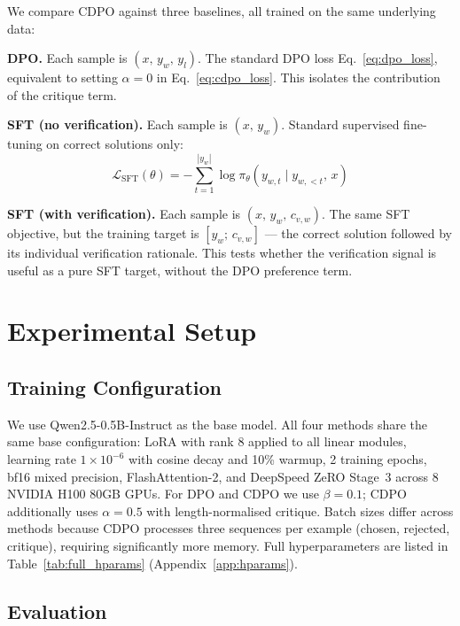 \documentclass[11pt]{article}
\begin{document}
We compare CDPO against three baselines, all trained on the same underlying data:

\textbf{DPO.} Each sample is $(x,\, y_w,\, y_l)$. The standard DPO loss Eq.~\eqref{eq:dpo_loss}, equivalent to setting $\alpha = 0$ in Eq.~\eqref{eq:cdpo_loss}. This isolates the contribution of the critique term.

\textbf{SFT (no verification).} Each sample is $(x,\, y_w)$. Standard supervised fine-tuning on correct solutions only:
\begin{equation}
    \mathcal{L}_{\text{SFT}}(\theta) = -\sum_{t=1}^{|y_w|} \log \pi_\theta(y_{w,t} \mid y_{w,<t},\, x)
    \label{eq:sft_baseline}
\end{equation}

\textbf{SFT (with verification).} Each sample is $(x,\, y_w,\, c_{v,w})$. The same SFT objective, but the training target is $[y_w;\, c_{v,w}]$ --- the correct solution followed by its individual verification rationale. This tests whether the verification signal is useful as a pure SFT target, without the DPO preference term.


\section{Experimental Setup}
\label{sec:experiments}

\subsection{Training Configuration}

We use Qwen2.5-0.5B-Instruct \autocite{qwen2024qwen25} as the base model. All four methods share the same base configuration: LoRA with rank 8 applied to all linear modules, learning rate $1 \times 10^{-6}$ with cosine decay and 10\% warmup, 2 training epochs, bf16 mixed precision, FlashAttention-2, and DeepSpeed ZeRO Stage~3 across 8 NVIDIA H100 80GB GPUs. For DPO and CDPO we use $\beta = 0.1$; CDPO additionally uses $\alpha = 0.5$ with length-normalised critique. Batch sizes differ across methods because CDPO processes three sequences per example (chosen, rejected, critique), requiring significantly more memory. Full hyperparameters are listed in Table~\ref{tab:full_hparams} (Appendix~\ref{app:hparams}).

\subsection{Evaluation}
\end{document}
